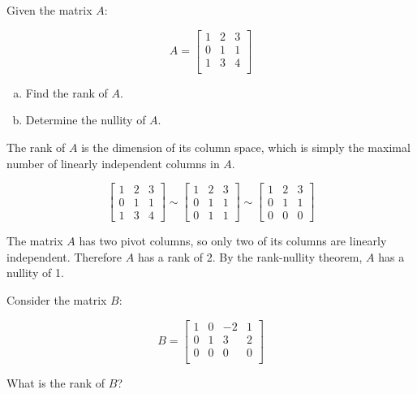 \documentclass{zupan}
\begin{document}
\begin{problem}{1}
  Given the matrix \(A\):

  \[
    A = \begin{bmatrix}
      1 & 2 & 3 \\
      0 & 1 & 1 \\
      1 & 3 & 4 \\
    \end{bmatrix}
  \]

  \begin{enumerate}[a., noitemsep]
    \item Find the rank of \(A\).
    \item Determine the nullity of \(A\).
  \end{enumerate}
\end{problem}

\begin{solution}
  The rank of $A$ is the dimension of its column space, which is simply the
  maximal number of linearly independent columns in $A$.

  \[
    \begin{bmatrix}
      1 & 2 & 3 \\
      0 & 1 & 1 \\
      1 & 3 & 4
    \end{bmatrix}
    \sim \begin{bmatrix}
      1 & 2 & 3 \\
      0 & 1 & 1 \\
      0 & 1 & 1
    \end{bmatrix}
    \sim \begin{bmatrix}
      1 & 2 & 3 \\
      0 & 1 & 1 \\
      0 & 0 & 0
    \end{bmatrix}
  \]

  The matrix \(A\) has two pivot columns, so only two of its columns are
  linearly independent. Therefore \(A\) has a rank of 2. By the rank-nullity
  theorem, \(A\) has a nullity of 1.
\end{solution}

\begin{problem}{2}
  Consider the matrix \(B\):

  \[
    B = \begin{bmatrix}
      1 & 0 & -2 & 1 \\
      0 & 1 & 3 & 2 \\
      0 & 0 & 0 & 0 \\
    \end{bmatrix}
  \]

  What is the rank of \(B\)?
\end{problem}
\end{document}
